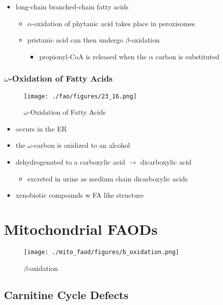 \documentclass{scrartcl}
\begin{document}
\begin{itemize}
\item long-chain branched-chain fatty acids
\begin{itemize}
\item \(\alpha\)-oxidation of phytanic acid takes place in peroxisomes
\item pristanic acid can then undergo \(\beta\)-oxidation
\begin{itemize}
\item propionyl-CoA is released when the \(\alpha\) carbon is substituted
\end{itemize}
\end{itemize}
\end{itemize}

\subsubsection{\(\omega\)-Oxidation of Fatty Acids}
\label{sec:org9883209}

\begin{figure}[htbp]
\centering
\texttt{[image: ./fao/figures/23\_16.png]}
\caption{\label{fig:org569d723}
\(\omega\)-Oxidation of Fatty Acids}
\end{figure}

\begin{itemize}
\item occurs in the ER
\item the \(\omega\)-carbon is oxidized to an alcohol
\item dehydrogenated to a carboxylic acid \(\to\) dicarboxylic acid
\begin{itemize}
\item excreted in urine as medium chain dicarboxylic acids
\end{itemize}
\item xenobiotic compounds w FA like structure
\end{itemize}
\section{Mitochondrial FAODs}
\label{sec:org3f55fca}
\begin{figure}[htbp]
\centering
\texttt{[image: ./mito\_faod/figures/b\_oxidation.png]}
\caption{\label{fig:org9ea42a2}
\(\beta\)-oxidation}
\end{figure}

\subsection{Carnitine Cycle Defects}
\label{sec:orgfc08876}
\end{document}
